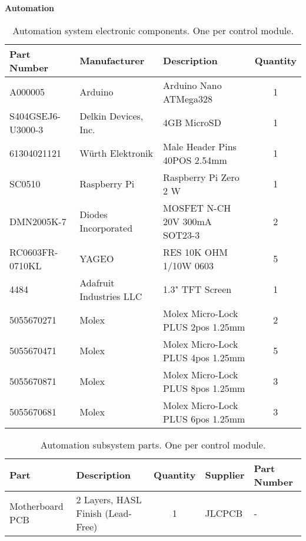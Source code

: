 \textbf{Automation}
\begin{table}[!ht]
    \centering
    \begin{tabular}{|l|l|l|c|}
    \hline
        Part Number         & Manufacturer              & Description                           & Quantity  \\ \hline
        A000005             & Arduino                   & Arduino Nano ATMega328                & 1         \\ \hline
        S404GSEJ6-U3000-3   & Delkin Devices, Inc.      & 4GB MicroSD                           & 1         \\ \hline
        61304021121         & Würth Elektronik          & Male Header Pins 40POS 2.54mm         & 1         \\ \hline
        SC0510              & Raspberry Pi              & Raspberry Pi Zero 2 W                 & 1         \\ \hline
        DMN2005K-7          & Diodes Incorporated       & MOSFET N-CH 20V 300mA SOT23-3         & 2         \\ \hline
        RC0603FR-0710KL     & YAGEO                     & RES 10K OHM 1/10W 0603                & 5         \\ \hline
        4484                & Adafruit Industries LLC   & 1.3" TFT Screen                     & 1         \\ \hline
        5055670271          & Molex                     & Molex Micro-Lock PLUS 2pos 1.25mm     & 2         \\ \hline
        5055670471          & Molex                     & Molex Micro-Lock PLUS 4pos 1.25mm     & 5         \\ \hline
        5055670871          & Molex                     & Molex Micro-Lock PLUS 8pos 1.25mm     & 3         \\ \hline
        5055670681          & Molex                     & Molex Micro-Lock PLUS 6pos 1.25mm     & 3         \\ \hline
    \end{tabular}
    \caption{Automation system electronic components. One per control module.}
    \label{tab:automation_components}
\end{table}

\begin{table}[!ht]
    \centering
    \begin{tabular}{|l|l|c|l|l|}
    \hline
        Part            & Description                       & Quantity  & Supplier  & Part Number  \\ \hline
        Motherboard PCB & 2 Layers, HASL Finish (Lead-Free) & 1         & JLCPCB    & -                     \\ \hline
    \end{tabular}
    \caption{Automation subsystem parts. One per control module.}
    \label{tab:automation_parts}
\end{table}

